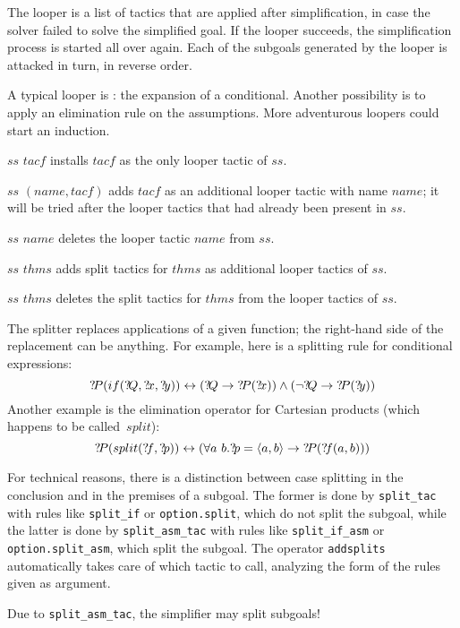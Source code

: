The looper is a list of tactics that are applied after simplification, in case
the solver failed to solve the simplified goal.  If the looper
succeeds, the simplification process is started all over again.  Each
of the subgoals generated by the looper is attacked in turn, in
reverse order.

A typical looper is : the expansion of a conditional.
Another possibility is to apply an elimination rule on the
assumptions.  More adventurous loopers could start an induction.

\begin{ttdescription}
  
\item[$ss$ \ttindexbold{setloop} $tacf$] installs $tacf$ as the only looper
  tactic of $ss$.
  
\item[$ss$ \ttindexbold{addloop} $(name,tacf)$] adds $tacf$ as an additional
  looper tactic with name $name$; it will be tried after the looper tactics
  that had already been present in $ss$.
  
\item[$ss$ \ttindexbold{delloop} $name$] deletes the looper tactic $name$
  from $ss$.
  
\item[$ss$ \ttindexbold{addsplits} $thms$] adds
  split tactics for $thms$ as additional looper tactics of $ss$.

\item[$ss$ \ttindexbold{addsplits} $thms$] deletes the
  split tactics for $thms$ from the looper tactics of $ss$.

\end{ttdescription}

The splitter replaces applications of a given function; the right-hand side
of the replacement can be anything.  For example, here is a splitting rule
for conditional expressions:
\[ \Var{P}(if(\Var{Q},\Var{x},\Var{y})) \bimp (\Var{Q} \imp \Var{P}(\Var{x}))
\conj (\lnot\Var{Q} \imp \Var{P}(\Var{y})) 
\] 
Another example is the elimination operator for Cartesian products (which
happens to be called~$split$):  
\[ {?\!P}(split({?\!f},{?\!p})) \leftrightarrow (\forall a~b. {?\!p} =
\langle a,b\rangle \rightarrow {?\!P}({?\!f}(a,b))) 
\] 

For technical reasons, there is a distinction between case splitting in the 
conclusion and in the premises of a subgoal. The former is done by
\texttt{split_tac} with rules like \texttt{split_if} or \texttt{option.split}, 
which do not split the subgoal, while the latter is done by 
\texttt{split_asm_tac} with rules like \texttt{split_if_asm} or 
\texttt{option.split_asm}, which split the subgoal.
The operator \texttt{addsplits} automatically takes care of which tactic to
call, analyzing the form of the rules given as argument.
\begin{warn}
Due to \texttt{split_asm_tac}, the simplifier may split subgoals!
\end{warn}

